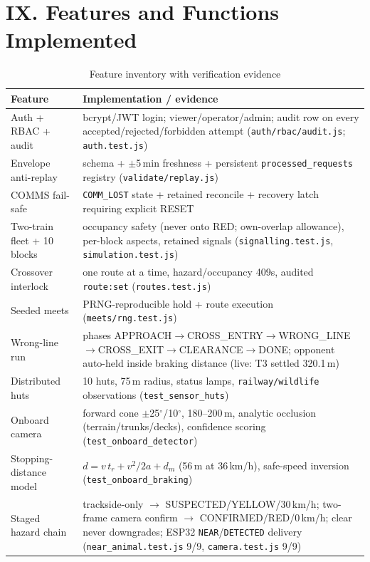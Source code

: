 \documentclass[10pt,a4paper,twocolumn]{article}
\newcommand{\sect}[1]{\section{#1}}
\begin{document}
\sect{IX. Features and Functions Implemented}
\begin{table}[H]\scriptsize
\caption{Feature inventory with verification evidence}\label{tab:feat}
\begin{tabularx}{\linewidth}{p{3.35cm} X}
\toprule
\textbf{Feature} & \textbf{Implementation / evidence}\\
\midrule
Auth + RBAC + audit & bcrypt/JWT login; viewer/operator/admin; audit row on every accepted/rejected/forbidden attempt (\texttt{auth/rbac/audit.js}; \texttt{auth.test.js})\\
Envelope anti-replay & schema + $\pm$5\,min freshness + persistent \texttt{processed\_requests} registry (\texttt{validate/replay.js})\\
COMMS fail-safe & \texttt{COMM\_LOST} state + retained reconcile + recovery latch requiring explicit RESET\\
Two-train fleet + 10 blocks & occupancy safety (never onto RED; own-overlap allowance), per-block aspects, retained signals (\texttt{signalling.test.js}, \texttt{simulation.test.js})\\
Crossover interlock & one route at a time, hazard/occupancy 409s, audited \texttt{route:set} (\texttt{routes.test.js})\\
Seeded meets & PRNG-reproducible hold + route execution (\texttt{meets/rng.test.js})\\
Wrong-line run & phases APPROACH$\rightarrow$CROSS\_ENTRY$\rightarrow$WRONG\_LINE$\rightarrow$CROSS\_EXIT$\rightarrow$CLEARANCE$\rightarrow$DONE; opponent auto-held inside braking distance (live: T3 settled 320.1\,m)\\
Distributed huts & 10 huts, 75\,m radius, status lamps, \texttt{railway/wildlife} observations (\texttt{test\_sensor\_huts})\\
Onboard camera & forward cone $\pm$25$^\circ$/10$^\circ$, 180--200\,m, analytic occlusion (terrain/trunks/decks), confidence scoring (\texttt{test\_onboard\_detector})\\
Stopping-distance model & $d=v\,t_r+v^2/2a+d_m$ (56\,m at 36\,km/h), safe-speed inversion (\texttt{test\_onboard\_braking})\\
Staged hazard chain & trackside-only $\rightarrow$ SUSPECTED/YELLOW/30\,km/h; two-frame camera confirm $\rightarrow$ CONFIRMED/RED/0\,km/h; clear never downgrades; ESP32 \texttt{NEAR}/\texttt{DETECTED} delivery (\texttt{near\_animal.test.js} 9/9, \texttt{camera.test.js} 9/9)\\

\end{tabularx}
\end{table}
\end{document}
